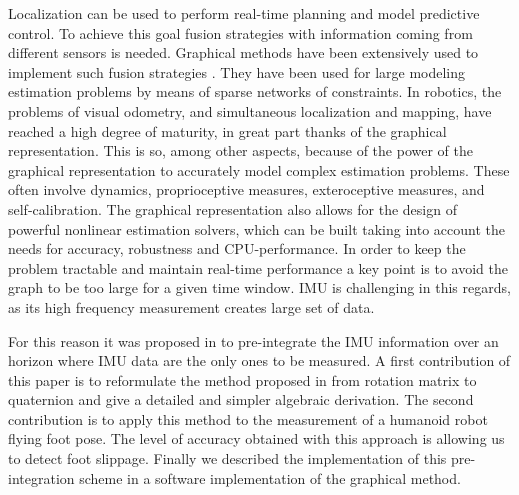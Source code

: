 Localization can be used to perform real-time planning and model predictive control.
To achieve this goal fusion strategies with information coming from different sensors is needed.
Graphical methods have been extensively used to implement such fusion strategies \cite{Thrun:ijrr:2006,Kaess:itro:2008}.
They have been used for large modeling estimation problems by means of sparse networks of constraints. 
In robotics, the problems of visual odometry, and simultaneous localization and mapping, have reached a high degree of maturity, 
in great part thanks of the graphical representation. 
This is so, among other aspects, because of the power of the graphical representation to accurately model complex estimation problems. 
These often involve dynamics, proprioceptive measures, exteroceptive measures, and self-calibration.
The graphical representation also allows for the design of powerful nonlinear estimation solvers, which can be built taking into account the needs for accuracy, 
robustness and CPU-performance.
In order to keep the problem tractable and maintain real-time performance a key point is to avoid the graph to be too large for a given time window.
IMU is challenging in this regards, as its high frequency measurement creates large set of data. 
 
For this reason it was proposed in \cite{LUPTON-09,forster2015imu} to pre-integrate the IMU information over an horizon where IMU data are the only
ones to be measured.
A first contribution of this paper is to reformulate the method proposed in \cite{forster2015imu} from rotation matrix to quaternion
and give a detailed and simpler algebraic derivation.
The second contribution is to apply this method to the measurement of a humanoid robot flying foot pose.
The level of accuracy obtained with this approach is allowing us to detect foot slippage. 
Finally we described the implementation of this pre-integration scheme in a software implementation of the graphical method.




